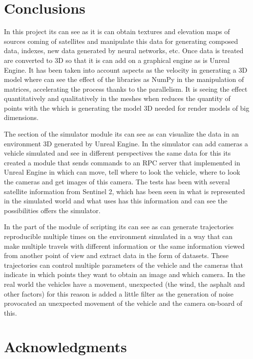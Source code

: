 \documentclass[10pt,a4paper,twocolumn,twoside]{article}
\begin{document}
\section{Conclusions}

In this project its can see as it is can obtain textures and elevation maps of sources coming of satellites and manipulate this data for generating composed data, indexes, new data generated by neural networks, etc. Once data is treated are converted to 3D so that it is can add on a graphical engine as is Unreal Engine. It has been taken into account aspects as the velocity in generating a 3D model where can see the effect of the libraries as NumPy in the manipulation of matrices, accelerating the process thanks to the parallelism. It is seeing the effect quantitatively and qualitatively in the meshes when reduces the quantity of points with the which is generating the model 3D needed for render models of big dimensions.

The section of the simulator module its can see as can visualize the data in an environment 3D generated by Unreal Engine. In the simulator can add cameras a vehicle simulated and see in different perspectives the same data for this its created a module that sends commands to an RPC server that implemented in Unreal Engine in which can move, tell where to look the vehicle, where to look the cameras and get images of this camera.
The tests has been with several satellite information from Sentinel 2, which has been seen in what is represented in the simulated world and what uses has this information and can see the possibilities offers the simulator.

In the part of the module of scripting its can see as can generate trajectories reproducible multiple times on the environment simulated in a way that can make multiple travels with different information or the same information viewed from another point of view and extract data in the form of datasets. These trajectories can control multiple parameters of the vehicle and the cameras that indicate in which points they want to obtain an image and which camera. In the real world the vehicles have a movement, unexpected (the wind, the asphalt and other factors) for this reason is added a little filter as the generation of noise provocated an unexpected movement of the vehicle and the camera on-board of this.


\section*{Acknowledgments}
\end{document}
